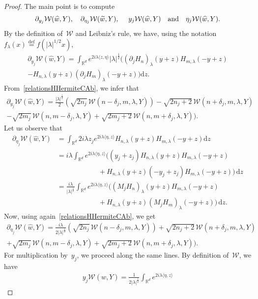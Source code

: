 \documentclass[11pt]{article}
\theoremstyle{definition}
\numberwithin{equation}{section}
\numberwithin{figure}{section}
\numberwithin{table}{section}
\newcommand{\lam}{\lambda}
\newcommand{\wt}{\widetilde}
\newcommand{\wh}{\widehat}
\newcommand*\cW{\mathcal{W}}
\newcommand*\R{\mathbb{R}}
\newcommand{\andf}{\quad\hbox{and}\quad}
\newcommand*\eqdefa{\overset{\mathrm{def}}{=}}
\newcommand*{\dd}{\mathrm{d}}
\newcommand{\dz}{\dd z}
\begin{document}
\begin{proof}
The main point is to compute
\[
\partial_{y_j} \cW(\wh w,Y),\quad\partial_{\eta_j} \cW(\wt w,Y),\quad\ y_j \cW(\wh w,Y)\andf \eta_j \cW(\wh w,Y).
\]
By the definition of~$\cW$ and Leibniz's rule, we have, using the notation $f_\lam(x)\eqdefa f(|\lam|^{1/2}x)$,
\begin{multline*}
\partial_{y_j} \cW(\wh w,Y) = \int_{\R^d} e^{2i\lam\langle z,\eta\rangle } |\lam|^{\frac 12}
\Big((\partial_jH_n)_{\lam} (y+z) H_{m,\lam} (-y+z) \\ -H_{n,\lam} (y+z) (\partial_jH_m)_\lam (-y+z) \Big)\dz.
\end{multline*}
From~\eqref{relationsHHermiteCAb}, we infer that
\begin{multline}\label{actionX_jonFHdemoeq1}
\!\!\partial_{y_j} \cW(\wh w,Y) = \frac {|\lam|^{\frac 12}} 2 (\sqrt {2n_j}\, \cW(n\!-\!\delta_j,m,\lam,Y)) -\sqrt {2n_j\!+\!2}\, \cW(n\!+\!\delta_j,m,\lam,Y) \\
-\sqrt {2m_j}\,\cW(n,m-\delta_j,\lam,Y) +\sqrt {2m_j+2}\,\cW(n,m+\delta_j,\lam,Y)).\!\!
\end{multline}
Let us observe that
\[
\begin{aligned}
\partial_{\eta_j} \cW(\wh w,Y) & = \int_{\R^d} 2i\lam z_j e^{2i\lam\langle \eta,z\rangle} H_{n,\lam}(y+z)H_{m,\lam} (-y+z) \dz\\
& = i\lam \int_{\R^d} e^{2i\lam\langle \eta,z\rangle}((y_j+z_j) H_{n,\lam}(y+z)H_{m,\lam} (-y+z) \\
& \qquad\qquad\qquad + H_{n,\lam}(y+z)(-y_j+z_j)H_{m,\lam} (-y+z))\,\dz\\
&= \frac {i\lam} {|\lam|^{\frac 12} }\int_{\R^d}e^{2i\lam\langle \eta,z\rangle} ((M_jH_{n})_\lam(y+z)H_{m,\lam} (-y+z) \\
& \qquad\qquad\qquad +H_{n,\lam}(y+z) (M_jH_m)_\lam(-y+z))\,\dz.
\end{aligned}
\]
Now, using again~\eqref{relationsHHermiteCAb}, we get
\begin{multline}\label{actionX_jonFHdemoeq2}
\partial_{\eta_j} \cW(\wh w,Y) \!= \frac {i\lam} {2|\lam|^{\frac 12} }(\sqrt {2n_j}\, \cW(n\!-\!\delta_j,m,\lam,Y) )
\!+\!\sqrt {2n_j\!+\!2}\, \cW(n\!+\!\delta_j,m,\lam,Y) \\
+\sqrt {2m_j}\,\cW(n,m-\delta_j,\lam,Y) +\sqrt {2m_j+2}\,\cW(n,m+\delta_j,\lam,Y)).
\end{multline}
For multiplication by~$y_j$, we proceed along the same lines. By definition of~$\cW$, we have
\begin{multline*}
y_j\cW(\wh w,Y) =\frac 1 {2|\lam|^{\frac12}}\! \int_{\R^d}\! e^{2i\lam\langle \eta,z\rangle}

\end{multline*}
\end{proof}
\end{document}

